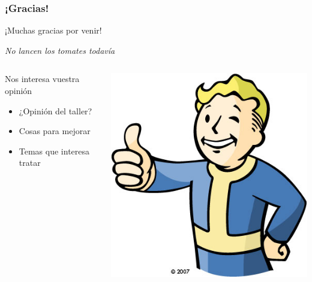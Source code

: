 \begin{frame}
	\frametitle{¡Gracias!}
	
	\begin{center}
    \huge{¡Muchas gracias por venir!}
    \end{center}
		
    \begin{center}
        \emph{No lancen los tomates todavía}
    \end{center}
    
	\begin{columns}[c]
	\column{200pt}	
	
	\begin{block}{Nos interesa vuestra opinión}
        \begin{itemize}
            \item ¿Opinión del taller?
            \item Cosas para mejorar
            \item Temas que interesa tratar
        \end{itemize}
    \end{block}
	
	\column{100pt}
	\begin{center}
	    \includegraphics[scale=0.3]{img/thumbs-up.jpg}
	\end{center}   
    
    \end{columns}  
	
\end{frame}
